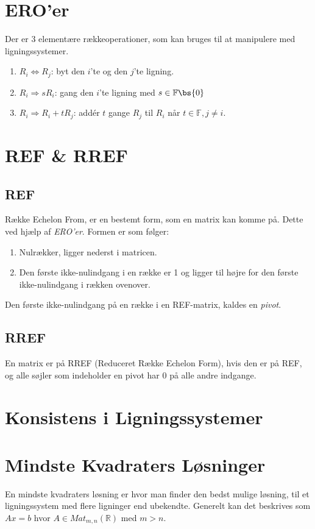 \section*{ERO'er}
Der er 3 elementære rækkeoperationer, som kan bruges til at manipulere med
ligningssystemer.

\begin{enumerate}
	\item $R_i \Leftrightarrow R_j$: byt den $i$'te og den $j$'te ligning.
	\item $R_i \Rightarrow sR_i$: gang den $i$'te ligning med $s \in 
		\mathbb{F} \bs \{0\}$
	\item $R_i \Rightarrow R_i+tR_j$: addér $t$ gange $R_j$ til $R_i$ når $t 
		\in \mathbb{F}, j \not= i$.
\end{enumerate}

\section{REF \& RREF}
\subsection{REF}
Række Echelon From, er en bestemt form, som en matrix kan komme på. Dette ved 
hjælp af \textit{ERO'er}. Formen er som følger:

\begin{enumerate}
	\item Nulrækker, ligger nederst i matricen.
	\item Den første ikke-nulindgang i en række er 1 og ligger til højre for
		den første ikke-nulindgang i rækken ovenover.
\end{enumerate}
Den første ikke-nulindgang på en række i en REF-matrix, kaldes en 
\textit{pivot}.

\subsection{RREF}
En matrix er på RREF (Reduceret Række Echelon Form), hvis den er på REF, og 
alle søjler som indeholder en pivot har 0 på alle andre indgange.

\section{Konsistens i Ligningssystemer}


\section{Mindste Kvadraters Løsninger}
En mindste kvadraters løsning er hvor man finder den bedst mulige løsning, til
et ligningssystem med flere ligninger end ubekendte. Generelt kan det beskrives
som $Ax=b$ hvor $A \in Mat_{m,n}(\mathbb{R})$ med $m>n$. 

